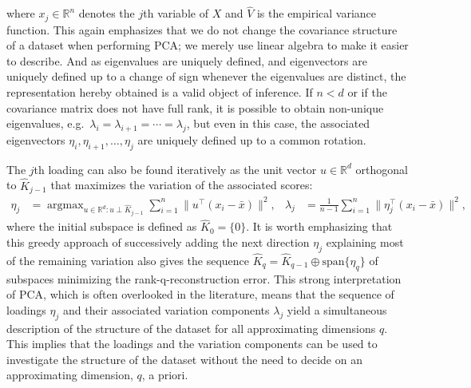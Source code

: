 \documentclass[titlepage,11pt,twoside]{article}
\newcommand{\hl}[1]{\textcolor{magenta}{#1}}
\newcommand{\RR}{\mathbb{R}}
\DeclareMathOperator*{\argmax}{argmax}
\begin{document}
where $x_j \in \RR^n$ 
denotes the $j$th variable of $X$ and $\hat{V}$ is the empirical variance function. This again emphasizes that we do not change the covariance structure of a dataset when performing PCA; we merely use linear algebra to make it easier to describe. And as eigenvalues are uniquely defined, and eigenvectors are uniquely defined up to a change of sign whenever the eigenvalues are %
distinct, the representation hereby obtained is a valid object of inference. If $n < d$ or if the covariance matrix does not have full rank, it is possible to obtain non-unique eigenvalues, e.g.\ $\lambda_i=\lambda_{i+1}=\dotsm=\lambda_j$, but even in this case, the associated eigenvectors $\eta_i,\eta_{i+1},\dotsc,\eta_j$ are uniquely defined up to a common rotation.

The $j$th loading can also be found iteratively as the unit vector $u \in \RR^d$ orthogonal to $\hat{K}_{j-1}$ that maximizes the variation of the associated scores:
\begin{align*}
\eta_j &= \argmax_{u \in \RR^d\colon u \perp \hat{K}_{j-1}} \sum_{i=1}^n \lVert u^\top (x_i - \bar{x}) \rVert^2, &
\lambda_j &= \frac{1}{n-1} \sum_{i=1}^n \lVert \eta_j^\top (x_i - \bar{x}) \rVert^2,
\end{align*}
where the initial subspace is defined as $\hat{K}_0 = \{0\}$. It is worth emphasizing that this greedy approach of successively adding the next direction $\eta_j$ explaining most of the remaining variation also gives the sequence $\hat{K}_q = \hat{K}_{q-1} \oplus \text{span} \{\eta_q\}$ of subspaces minimizing the rank-q-reconstruction error. This strong interpretation of PCA, which is often overlooked in the literature, means that the sequence of loadings $\eta_j$ and their associated variation components $\lambda_j$ yield a simultaneous description of the structure of the dataset for all approximating dimensions $q$. This implies that the loadings and the variation components can be used to investigate the structure of the dataset without the need to decide on an approximating dimension, $q$, a priori.
\end{document}
